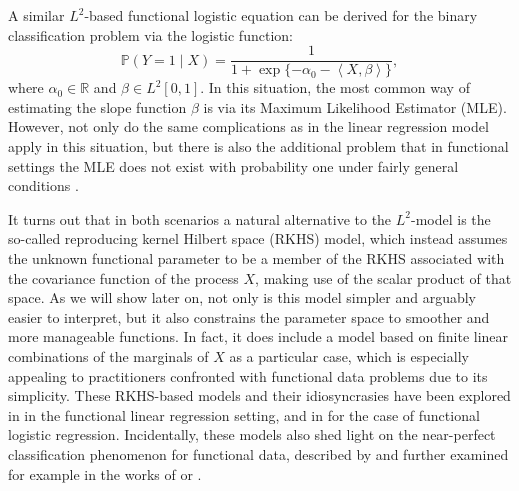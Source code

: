\documentclass{article}
\numberwithin{equation}{section}
\theoremstyle{plain}
\newcommand{\R}{\mathbb{R}}
\newcommand\dotprod[2]{\left\langle#1,#2\right\rangle}
\begin{document}
A similar \(L^2\)-based functional logistic equation can be derived for the binary classification problem via the logistic function:
\begin{equation}\label{eq:l2-logistic-model}
  \mathbb P(Y=1 \mid X) = \frac{1}{1 + \exp\{-\alpha_0 - \dotprod{X}{\beta}\}},
\end{equation}
where \(\alpha_0 \in \R\) and \(\beta \in L^2[0, 1]\). In this situation, the most common way of estimating the slope function \(\beta\) is via its Maximum Likelihood Estimator (MLE). However, not only do the same complications as in the linear regression model apply in this situation, but there is also the additional problem that in functional settings the MLE does not exist with probability one under fairly general conditions \citep[see][]{berrendero2023functional}.

It turns out that in both scenarios a natural alternative to the \(L^2\)-model is the so-called reproducing kernel Hilbert space (RKHS) model, which instead assumes the unknown functional parameter to be a member of the RKHS associated with the covariance function of the process \(X\), making use of the scalar product of that space. As we will show later on, not only is this model simpler and arguably easier to interpret, but it also constrains the parameter space to smoother and more manageable functions. In fact, it does include a model based on finite linear combinations of the marginals of \(X\) as a particular case, which is especially appealing to practitioners confronted with functional data problems due to its simplicity. These RKHS-based models and their idiosyncrasies have been explored in \citet{berrendero2019rkhs, berrendero2020general} in the functional linear regression setting, and in \citet{berrendero2023functional} for the case of functional logistic regression. Incidentally, these models also shed light on the near-perfect classification phenomenon for functional data, described by \citet{delaigle2012achieving} and further examined for example in the works of \citet{berrendero2018use} or \citet{torrecilla2020optimal}.
\end{document}
